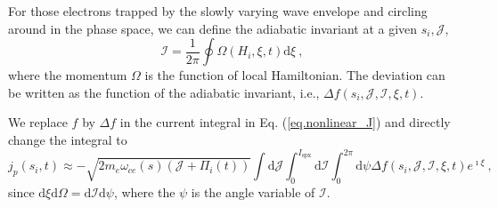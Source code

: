 For those electrons trapped by the slowly varying wave envelope and circling around in the phase space, we can define the adiabatic invariant at a given $s_i,\mathcal{J}$,
\begin{equation}\label{eq.def_I}
    \mathcal{I} = \frac{1}{2\pi} \oint \Omega(H_i,\xi,t) \mathrm{d} \xi~,
\end{equation}
where the momentum $\Omega$ is the function of local Hamiltonian.
The deviation can be written as the function of the adiabatic invariant, i.e., $\Delta f(s_i,\mathcal{J},\mathcal{I},\xi,t)$.

We replace $f$ by $\Delta f$ in the current integral in Eq. (\ref{eq.nonlinear_J}) and directly change the integral to 
\begin{equation}
    j_p(s_i,t) \approx - \sqrt{2m_e\omega_{ce}(s)(\mathcal{J} + \Pi_i(t))}\int\mathrm{d} \mathcal{J} \int_0^{I_{\mathrm{s p x}}}  \mathrm{d}\mathcal{I}  \int_0^{2\pi} \mathrm{d}\psi  \Delta f(s_i,\mathcal{J},\mathcal{I},\xi,t)e^{\imath \xi}  ~,
\end{equation}
since $\mathrm{d}\xi\mathrm{d}\Omega = \mathrm{d}\mathcal{I}\mathrm{d}\psi$, where the $\psi$ is the angle variable of $\mathcal{I}$.

